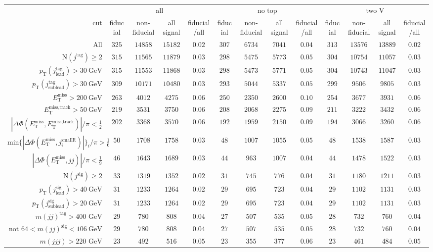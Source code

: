 \begin{tabular}{r|c|c|c|c|c|c|c|c|c|c|c|c|}
 &\multicolumn{4}{|c|}{all}&\multicolumn{4}{c|}{no top}&\multicolumn{4}{|c|}{two V}\\
cut&fiducial&non-fiducial&all signal&fiducial/all&fiducial&non-fiducial&all signal&fiducial/all&fiducial&non-fiducial&all signal&fiducial/all\\
\hline
All&$325$&$14858$&$15182$&$0.02$&$307$&$6734$&$7041$&$0.04$&$313$&$13576$&$13889$&$0.02$\\
$\text{N}(j^\text{tag})\geq2$&$315$&$11565$&$11879$&$0.03$&$298$&$5475$&$5773$&$0.05$&$304$&$10754$&$11057$&$0.03$\\
$p_\text{T}(j^\text{tag}_\text{lead})>30~\text{GeV}$&$315$&$11553$&$11868$&$0.03$&$298$&$5473$&$5771$&$0.05$&$304$&$10743$&$11047$&$0.03$\\
$p_\text{T}(j^\text{tag}_\text{sublead})>30~\text{GeV}$&$309$&$10171$&$10480$&$0.03$&$293$&$5044$&$5337$&$0.05$&$299$&$9506$&$9805$&$0.03$\\
$E_\text{T}^\text{miss} > 200~\text{GeV}$&$263$&$4012$&$4275$&$0.06$&$250$&$2350$&$2600$&$0.10$&$254$&$3677$&$3931$&$0.06$\\
$E_\text{T}^\text{miss,track} > 50~\text{GeV}$&$219$&$3531$&$3750$&$0.06$&$208$&$2068$&$2275$&$0.09$&$211$&$3222$&$3432$&$0.06$\\
$|\Delta\Phi(E_\text{T}^\text{miss},E_\text{T}^\text{miss,track})|/\pi<\frac{1}{2}$&$202$&$3368$&$3570$&$0.06$&$192$&$1959$&$2150$&$0.09$&$194$&$3066$&$3260$&$0.06$\\
$\text{min}\{|\Delta\Phi(E_\text{T}^\text{miss},j^\text{smallR}_i)|\}_i/\pi > \frac{1}{6}$&$50$&$1708$&$1758$&$0.03$&$48$&$1007$&$1055$&$0.05$&$48$&$1538$&$1587$&$0.03$\\
$|\Delta\Phi(E_\text{T}^\text{miss},jj)|/\pi < \frac{1}{9}$&$46$&$1643$&$1689$&$0.03$&$44$&$963$&$1007$&$0.04$&$44$&$1478$&$1522$&$0.03$\\
$\text{N}(j^\text{sig})\geq2$&$33$&$1319$&$1352$&$0.02$&$31$&$745$&$776$&$0.04$&$31$&$1180$&$1211$&$0.03$\\
$p_\text{T}(j^\text{sig}_\text{lead})>40~\text{GeV}$&$31$&$1233$&$1264$&$0.02$&$29$&$695$&$723$&$0.04$&$29$&$1102$&$1131$&$0.03$\\
$p_\text{T}(j^\text{sig}_\text{sublead})>20~\text{GeV}$&$31$&$1233$&$1264$&$0.02$&$29$&$695$&$723$&$0.04$&$29$&$1102$&$1131$&$0.03$\\
$m(jj)^\text{tag}>400\text{ GeV}$&$29$&$780$&$808$&$0.04$&$27$&$507$&$535$&$0.05$&$28$&$732$&$760$&$0.04$\\
$\text{not }64<m(jj)^\text{sig}<106~\text{GeV}$&$29$&$780$&$808$&$0.04$&$27$&$507$&$535$&$0.05$&$28$&$732$&$760$&$0.04$\\
$m(jjj)>220\text{ GeV}$&$23$&$492$&$516$&$0.05$&$23$&$355$&$377$&$0.06$&$23$&$461$&$484$&$0.05$\\
\end{tabular}
